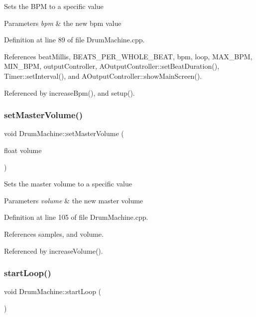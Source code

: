 Sets the B\+PM to a specific value 
\begin{DoxyParams}{Parameters}
{\em bpm} & the new bpm value \\
\hline
\end{DoxyParams}


Definition at line 89 of file Drum\+Machine.\+cpp.



References beat\+Millis, B\+E\+A\+T\+S\+\_\+\+P\+E\+R\+\_\+\+W\+H\+O\+L\+E\+\_\+\+B\+E\+AT, bpm, loop, M\+A\+X\+\_\+\+B\+PM, M\+I\+N\+\_\+\+B\+PM, output\+Controller, A\+Output\+Controller\+::set\+Beat\+Duration(), Timer\+::set\+Interval(), and A\+Output\+Controller\+::show\+Main\+Screen().



Referenced by increase\+Bpm(), and setup().

\mbox{\label{class_drum_machine_a19af9f5fbe3242cee5685f1ede574a26}} 
\subsubsection{\texorpdfstring{set\+Master\+Volume()}{setMasterVolume()}}
{\footnotesize\ttfamily void Drum\+Machine\+::set\+Master\+Volume (\begin{DoxyParamCaption}\item[{float}]{volume }\end{DoxyParamCaption})}

Sets the master volume to a specific value 
\begin{DoxyParams}{Parameters}
{\em volume} & the new master volume \\
\hline
\end{DoxyParams}


Definition at line 105 of file Drum\+Machine.\+cpp.



References samples, and volume.



Referenced by increase\+Volume().

\mbox{\label{class_drum_machine_ac42508031bbf331d41c8004ed663c1c1}} 
\subsubsection{\texorpdfstring{start\+Loop()}{startLoop()}}
{\footnotesize\ttfamily void Drum\+Machine\+::start\+Loop (\begin{DoxyParamCaption}{ }\end{DoxyParamCaption})}

